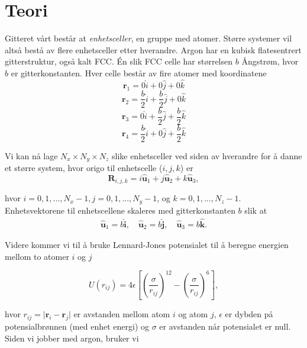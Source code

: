 \documentclass[paper=a4, fontsize=11pt]{scrartcl} %
\numberwithin{equation}{section} %
\numberwithin{figure}{section} %
\numberwithin{table}{section} %
\begin{document}
\section{Teori}
Gitteret vårt består at \textit{enhetsceller}, en gruppe med atomer. Større systemer vil altså bestå av flere enhetsceller etter hverandre. Argon har en kubisk flatesentrert gitterstruktur, også kalt FCC. Én slik FCC celle har størrelsen $b$ Ångstrøm, hvor $b$ er gitterkonstanten. Hver celle består av fire atomer med koordinatene
\begin{equation}
\textbf{r}_1 = 0 \hat{i} + 0 \hat{j} + 0 \hat{k}
\end{equation}
\begin{equation}
\textbf{r}_2 = \frac{b}{2} \hat{i} + \frac{b}{2} \hat{j} + 0 \hat{k}
\end{equation}
\begin{equation}
\textbf{r}_3 = 0 \hat{i} + \frac{b}{2} \hat{j} + \frac{b}{2} \hat{k}
\end{equation}
\begin{equation}
\textbf{r}_4 = \frac{b}{2} \hat{i} + 0 \hat{j} + \frac{b}{2} \hat{k}
\end{equation}

Vi kan nå lage $N_x \times N_y \times N_z$ slike enhetsceller ved siden av hverandre for å danne et større system, hvor origo til enhetscelle ($i,j,k$) er 
\begin{equation}
\mathbf{R}_{i,j,k} = i \hat{\mathbf{u}}_1 + j \hat{\mathbf{u}}_2 + k \hat{\mathbf{u}}_3,
\end{equation}

hvor $i=0,1,..., N_x-1, j=0,1,..., N_y-1$, og $k=0,1,..., N_z-1$. Enhetsvektorene til enhetscellene skaleres med gitterkonstanten $b$ slik at
\begin{align}
	\hat{\mathbf{u}}_1 = b\hat{\mathbf{i}}, \quad \hat{\mathbf{u}}_2 = b\hat{\mathbf{j}}, \quad \hat{\mathbf{u}}_3 = b\hat{\mathbf{k}}.
\end{align}

Videre kommer vi til å bruke Lennard-Jones potensialet til å beregne energien mellom to atomer $i$ og $j$

\begin{equation}
U(r_{ij}) = 4\epsilon\left[\left(\frac{\sigma}{r_{ij}}\right)^{12} - \left(\frac{\sigma}{r_{ij}}\right)^6\right],
\end{equation}

hvor $r_{ij} = \vert\mathbf{r}_i - \mathbf{r}_j\vert$  er avstanden mellom atom $i$ og atom $j$, $\epsilon$ er dybden på potensialbrønnen (med enhet energi) og $\sigma$ er avstanden når potensialet er null. Siden vi jobber med argon, bruker vi 
\end{document}
